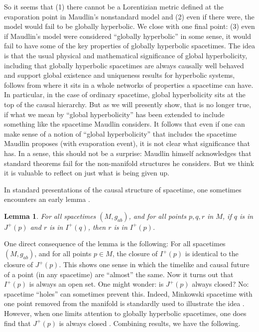 \documentclass[authoryear,12pt,3p]{jowarticle}
\newtheorem{lem}[thm]{Lemma}
\begin{document}
So it seems that (1) there cannot be a Lorentizian metric defined at the evaporation point in Maudlin's nonstandard model and (2) even if there were, the model would fail to be globally hyperbolic. We close with one final point: (3) even if Maudlin's model were considered ``globally hyperbolic'' in some sense, it would fail to have some of the key properties of globally hyperbolic spacetimes.  The idea is that the usual physical and mathematical significance of global hyperbolicity, including that globally hyperbolic spacetimes are always causally well behaved and support global existence and uniqueness results for hyperbolic systems, follows from where it sits in a whole networks of properties a spacetime can have.  In particular, in the case of ordinary spacetime, global hyperbolicity sits at the top of the causal hierarchy.  But as we will presently show, that is no longer true, if what we mean by ``global hyperbolicity'' has been extended to include something like the spacetime Maudlin considers.  It follows that even if one can make sense of a notion of ``global hyperbolicity'' that includes the spacetime Maudlin proposes (with evaporation event), it is not clear what significance that has.  In a sense, this should not be a surprise: Maudlin himself acknowledges that standard theorems fail for the non-manifold structures he considers.  But we think it is valuable to reflect on just what is being given up.

In standard presentations of the causal structure of spacetime, one sometimes encounters an early lemma \citep[p. 183]{Hawking+Ellis}.\\

\begin{lem} For all spacetimes $(M,g_{ab})$, and for all points $p, q, r$ in $M$, if $q$ is in $J^+(p)$ and $r$ is in $I^+(q)$, then $r$ is in $I^+(p)$. \end{lem}

One direct consequence of the lemma is the following: For all spacetimes $(M,g_{ab})$, and for all points $p \in M$, the closure of $I^+(p)$ is identical to the closure of $J^+(p)$. This shows one sense in which the timelike and causal future of a point (in any spacetime) are ``almost'' the same. Now it turns out that $I^+(p)$ is always an open set. One might wonder: is $J^+(p)$ always closed? No: spacetime ``holes'' can sometimes prevent this. Indeed, Minkowski spacetime with one point removed from the manifold is standardly used to illustrate the idea \citep[p. 191]{Wald}. However, when one limits attention to globally hyperbolic spacetimes, one does find that $J^+(p)$ is always closed \citep[p. 208]{Wald}. Combining results, we have the following. \\
\end{document}
